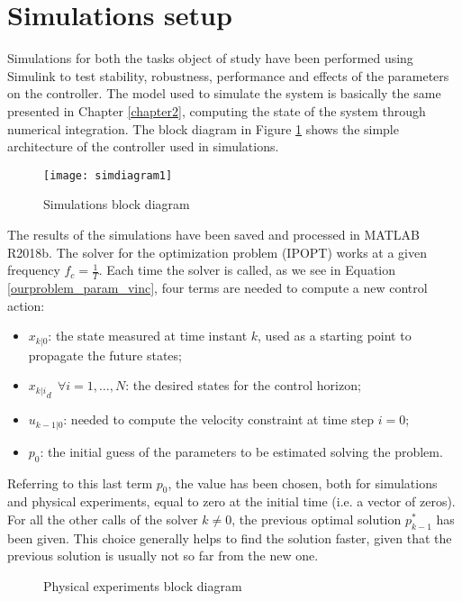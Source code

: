 \section{Simulations setup}

Simulations for both the tasks object of study have been performed using Simulink to test stability, robustness, performance and effects of the parameters on the controller. The model used to simulate the system is basically the same presented in Chapter \ref{chapter2}, computing the state of the system through numerical integration. The block diagram in Figure \ref{simdiagram1} shows the simple architecture of the controller used in simulations.

\begin{figure}[h!]
\texttt{[image: simdiagram1]}
\centering
\caption{Simulations block diagram} 
\label{simdiagram1}
\end{figure}

The results of the simulations have been saved and processed in MATLAB R2018b. The solver for the optimization problem (IPOPT) works at a given frequency $f_c=\frac{1}{T}$. Each time the solver is called, as we see in Equation \eqref{ourproblem_param_vinc}, four terms are needed to compute a new control action: 
\begin{itemize}
\item $x_{k|0}$: the state measured at time instant $k$, used as a starting point to propagate the future states;
\item ${x_{k|i}}_d \ \ \forall i=1,\dots,N$: the desired states for the control horizon;
\item $u_{k-1|0}$: needed to compute the velocity constraint at time step $i=0$;
\item $p_0$: the initial guess of the parameters to be estimated solving the problem.
\end{itemize}
Referring to this last term $p_0$, the value has been chosen, both for simulations and physical experiments, equal to zero at the initial time (i.e. a vector of zeros). For all the other calls of the solver $k\neq0$, the previous optimal solution $p_{k-1}^*$ has been given. This choice generally helps to find the solution faster, given that the previous solution is usually not so far from the new one.
\begin{figure}[h!]
	
	\centering
	
	\caption{Physical experiments block diagram} 
	
	\label{diagramreal}
\end{figure}
